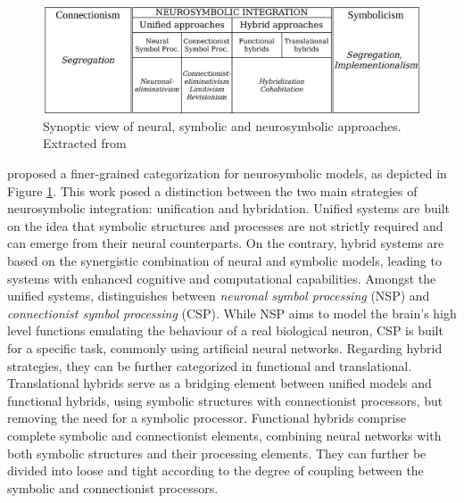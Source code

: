 \begin{figure}[t]
    \centering
    \includegraphics[width=\linewidth]{3_stateoftheart/figures/Hilario_categorization.eps}
    \caption{Synoptic view of neural, symbolic and neurosymbolic approaches. Extracted from \cite{hilario_overview_nodate}}
    \label{fig:hilario_categorization}
\end{figure}

\cite{hilario_overview_nodate} proposed a finer-grained categorization for neurosymbolic models, as depicted in Figure \ref{fig:hilario_categorization}. This work posed a distinction between the two main strategies of neurosymbolic integration: unification and hybridation. Unified systems are built on the idea that symbolic structures and processes are not strictly required and can emerge from their neural counterparts. On the contrary, hybrid systems are based on the synergistic combination of neural and symbolic models, leading to systems with enhanced cognitive and computational capabilities. Amongst the unified systems, \cite{hilario_overview_nodate} distinguishes between \textit{neuronal symbol processing} (NSP) and \textit{connectionist symbol processing} (CSP). While NSP aims to model the brain's high level functions emulating the behaviour of a real biological neuron, CSP is built for a specific task, commonly using artificial neural networks. Regarding hybrid strategies, they can be further categorized in functional and translational. Translational hybrids serve as a bridging element between unified models and functional hybrids, using symbolic structures with connectionist processors, but removing the need for a symbolic processor. Functional hybrids comprise complete symbolic and connectionist elements, combining neural networks with both symbolic structures and their processing elements. They can further be divided into loose and tight according to the degree of coupling between the symbolic and connectionist processors. 


